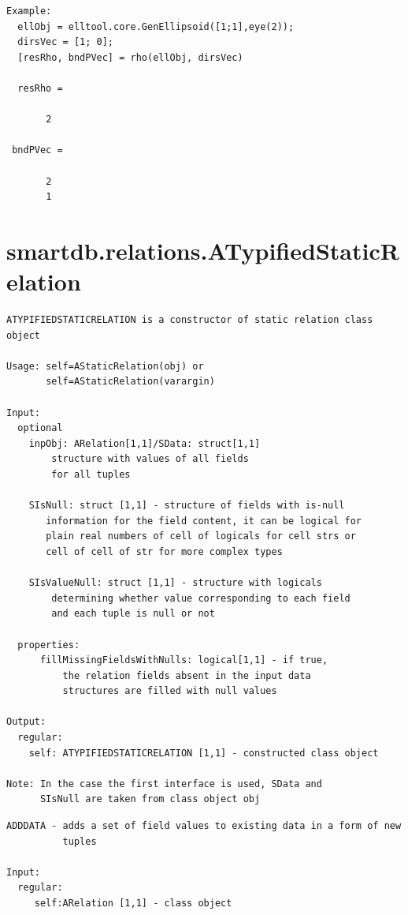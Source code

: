\documentclass[letterpaper,10pt,english]{sphinxmanual}
\begin{document}
\begin{Verbatim}[commandchars=\\\{\}]
Example:
  ellObj = elltool.core.GenEllipsoid([1;1],eye(2));
  dirsVec = [1; 0];
  [resRho, bndPVec] = rho(ellObj, dirsVec)

  resRho =

       2

 bndPVec =

       2
       1
\end{Verbatim}


\section{smartdb.relations.ATypifiedStaticRelation}
\label{chap_func:smartdb-relations-atypifiedstaticrelation}
\begin{Verbatim}[commandchars=\\\{\}]
ATYPIFIEDSTATICRELATION is a constructor of static relation class
object

Usage: self=AStaticRelation(obj) or
       self=AStaticRelation(varargin)

Input:
  optional
    inpObj: ARelation[1,1]/SData: struct[1,1]
        structure with values of all fields
        for all tuples

    SIsNull: struct [1,1] - structure of fields with is-null
       information for the field content, it can be logical for
       plain real numbers of cell of logicals for cell strs or
       cell of cell of str for more complex types

    SIsValueNull: struct [1,1] - structure with logicals
        determining whether value corresponding to each field
        and each tuple is null or not

  properties:
      fillMissingFieldsWithNulls: logical[1,1] - if true,
          the relation fields absent in the input data
          structures are filled with null values

Output:
  regular:
    self: ATYPIFIEDSTATICRELATION [1,1] - constructed class object

Note: In the case the first interface is used, SData and
      SIsNull are taken from class object obj
\end{Verbatim}
\label{chap_func:smartdb-relations-atypifiedstaticrelation-adddata}
\begin{Verbatim}[commandchars=\\\{\}]
ADDDATA - adds a set of field values to existing data in a form of new
          tuples

Input:
  regular:
     self:ARelation [1,1] - class object
\end{Verbatim}
\end{document}
